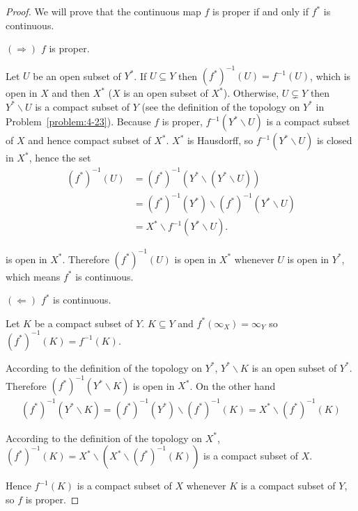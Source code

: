 \begin{proof}
	We will prove that the continuous map $f$ is proper if and only if $f^{*}$ is continuous.

	$(\Longrightarrow)$ $f$ is proper.

	Let $U$ be an open subset of $Y^{*}$. If $U \subseteq Y$ then ${(f^{*})}^{-1}(U) = f^{-1}(U)$, which is open in $X$ and then $X^{*}$ ($X$ is an open subset of $X^{*}$). Otherwise, $U \subsetneq Y$ then $Y^{*}\smallsetminus U$ is a compact subset of $Y$ (see the definition of the topology on $Y^{*}$ in Problem~\ref{problem:4-23}). Because $f$ is proper, $f^{-1}(Y^{*}\smallsetminus U)$ is a compact subset of $X$ and hence compact subset of $X^{*}$. $X^{*}$ is Hausdorff, so $f^{-1}(Y^{*}\smallsetminus U)$ is closed in $X^{*}$, hence the set
	\begin{align*}
		{(f^{*})}^{-1}(U) & = {(f^{*})}^{-1}(Y^{*} \smallsetminus (Y^{*}\smallsetminus U))               \\
		                  & = {(f^{*})}^{-1}(Y^{*}) \smallsetminus {(f^{*})}^{-1}(Y^{*}\smallsetminus U) \\
		                  & = X^{*} \smallsetminus f^{-1}(Y^{*}\smallsetminus U).
	\end{align*}

	is open in $X^{*}$. Therefore ${(f^{*})}^{-1}(U)$ is open in $X^{*}$ whenever $U$ is open in $Y^{*}$, which means $f^{*}$ is continuous.

	$(\Longleftarrow)$ $f^{*}$ is continuous.

	Let $K$ be a compact subset of $Y$. $K\subseteq Y$ and $f^{*}(\infty_{X}) = \infty_{Y}$ so ${(f^{*})}^{-1}(K) = f^{-1}(K)$.

	According to the definition of the topology on $Y^{*}$, $Y^{*}\smallsetminus K$ is an open subset of $Y^{*}$. Therefore ${(f^{*})}^{-1}(Y^{*}\smallsetminus K)$ is open in $X^{*}$. On the other hand
	\begin{align*}
		{(f^{*})}^{-1}(Y^{*}\smallsetminus K) = {(f^{*})}^{-1}(Y^{*}) \smallsetminus {(f^{*})}^{-1}(K) = X^{*} \smallsetminus {(f^{*})}^{-1}(K)
	\end{align*}

	According to the definition of the topology on $X^{*}$, ${(f^{*})}^{-1}(K) = X^{*} \smallsetminus (X^{*} \smallsetminus {(f^{*})}^{-1}(K))$ is a compact subset of $X$.

	Hence $f^{-1}(K)$ is a compact subset of $X$ whenever $K$ is a compact subset of $Y$, so $f$ is proper.
\end{proof}

